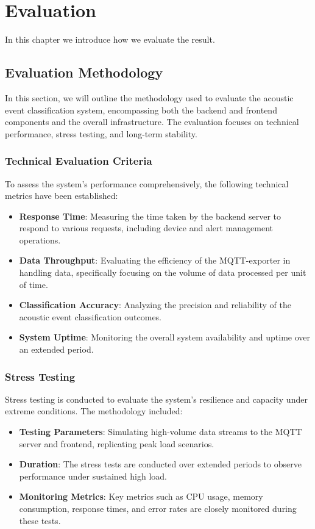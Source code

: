 \chapter{Evaluation}
In this chapter we introduce how we evaluate the result.

\section{Evaluation Methodology}
In this section, we will outline the methodology used to evaluate the acoustic event classification system, encompassing both the backend and frontend components and the overall infrastructure. The evaluation focuses on technical performance, stress testing, and long-term stability.

\subsection{Technical Evaluation Criteria}
To assess the system's performance comprehensively, the following technical metrics have been established:

\begin{itemize}
  \item \textbf{Response Time}: Measuring the time taken by the backend server to respond to various requests, including device and alert management operations.
  \item \textbf{Data Throughput}: Evaluating the efficiency of the MQTT-exporter in handling data, specifically focusing on the volume of data processed per unit of time.
  \item \textbf{Classification Accuracy}: Analyzing the precision and reliability of the acoustic event classification outcomes.
  \item \textbf{System Uptime}: Monitoring the overall system availability and uptime over an extended period.
\end{itemize}
\subsection{Stress Testing}
Stress testing is conducted to evaluate the system's resilience and capacity under extreme conditions. The methodology included:

\begin{itemize}
  \item \textbf{Testing Parameters}: Simulating high-volume data streams to the MQTT server and frontend, replicating peak load scenarios.
  \item \textbf{Duration}: The stress tests are conducted over extended periods to observe performance under sustained high load.
  \item \textbf{Monitoring Metrics}: Key metrics such as CPU usage, memory consumption, response times, and error rates are closely monitored during these tests.
\end{itemize}

